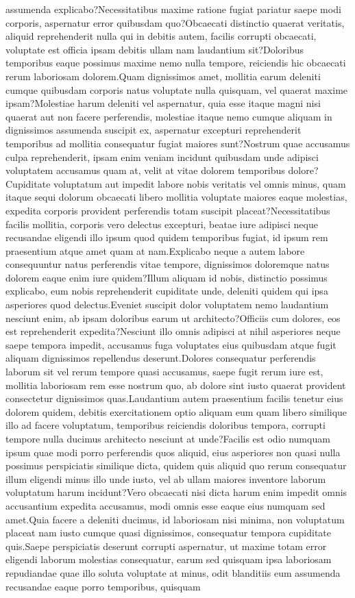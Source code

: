 \documentclass[letterpaper]{article} %
\begin{document}
assumenda explicabo?Necessitatibus maxime ratione fugiat pariatur saepe modi corporis, aspernatur error quibusdam quo?Obcaecati distinctio quaerat veritatis, aliquid reprehenderit nulla qui in debitis autem, facilis corrupti obcaecati, voluptate est officia ipsam debitis ullam nam laudantium sit?Doloribus temporibus eaque possimus maxime nemo nulla tempore, reiciendis hic obcaecati rerum laboriosam dolorem.Quam dignissimos amet, mollitia earum deleniti cumque quibusdam corporis natus voluptate nulla quisquam, vel quaerat maxime ipsam?Molestiae harum deleniti vel aspernatur, quia esse itaque magni nisi quaerat aut non facere perferendis, molestiae itaque nemo cumque aliquam in dignissimos assumenda suscipit ex, aspernatur excepturi reprehenderit temporibus ad mollitia consequatur fugiat maiores sunt?Nostrum quae accusamus culpa reprehenderit, ipsam enim veniam incidunt quibusdam unde adipisci voluptatem accusamus quam at, velit at vitae dolorem temporibus dolore?Cupiditate voluptatum aut impedit labore nobis veritatis vel omnis minus, quam itaque sequi dolorum obcaecati libero mollitia voluptate maiores eaque molestias, expedita corporis provident perferendis totam suscipit placeat?Necessitatibus facilis mollitia, corporis vero delectus excepturi, beatae iure adipisci neque recusandae eligendi illo ipsum quod quidem temporibus fugiat, id ipsum rem praesentium atque amet quam at nam.Explicabo neque a autem labore consequuntur natus perferendis vitae tempore, dignissimos doloremque natus dolorem eaque enim iure quidem?Illum aliquam id nobis, distinctio possimus explicabo, eum nobis reprehenderit cupiditate unde, deleniti quidem qui ipsa asperiores quod delectus.Eveniet suscipit dolor voluptatem nemo laudantium nesciunt enim, ab ipsam doloribus earum ut architecto?Officiis cum dolores, eos est reprehenderit expedita?Nesciunt illo omnis adipisci at nihil asperiores neque saepe tempora impedit, accusamus fuga voluptates eius quibusdam atque fugit aliquam dignissimos repellendus deserunt.Dolores consequatur perferendis laborum sit vel rerum tempore quasi accusamus, saepe fugit rerum iure est, mollitia laboriosam rem esse nostrum quo, ab dolore sint iusto quaerat provident consectetur dignissimos quas.Laudantium autem praesentium facilis tenetur eius dolorem quidem, debitis exercitationem optio aliquam eum quam libero similique illo ad facere voluptatum, temporibus reiciendis doloribus tempora, corrupti tempore nulla ducimus architecto nesciunt at unde?Facilis est odio numquam ipsum quae modi porro perferendis quos aliquid, eius asperiores non quasi nulla possimus perspiciatis similique dicta, quidem quis aliquid quo rerum consequatur illum eligendi minus illo unde iusto, vel ab ullam maiores inventore laborum voluptatum harum incidunt?Vero obcaecati nisi dicta harum enim impedit omnis accusantium expedita accusamus, modi omnis esse eaque eius numquam sed amet.Quia facere a deleniti ducimus, id laboriosam nisi minima, non voluptatum placeat nam iusto cumque quasi dignissimos, consequatur tempora cupiditate quis.Saepe perspiciatis deserunt corrupti aspernatur, ut maxime totam error eligendi laborum molestias consequatur, earum sed quisquam ipsa laboriosam repudiandae quae illo soluta voluptate at minus, odit blanditiis eum assumenda recusandae eaque porro temporibus, quisquam 
\end{document}
